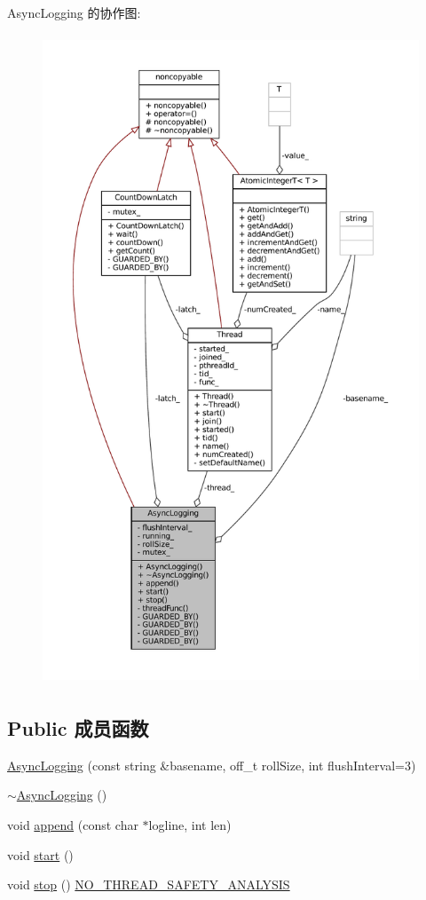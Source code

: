 Async\+Logging 的协作图\+:
\nopagebreak
\begin{figure}[H]
\begin{center}
\leavevmode
\includegraphics[height=550pt]{classmuduo_1_1AsyncLogging__coll__graph}
\end{center}
\end{figure}
\subsection*{Public 成员函数}
\begin{DoxyCompactItemize}
\item 
\hyperlink{classmuduo_1_1AsyncLogging_a6ef9864cb4ac325e919c449e1dd76224}{Async\+Logging} (const string \&basename, off\+\_\+t roll\+Size, int flush\+Interval=3)
\item 
\hyperlink{classmuduo_1_1AsyncLogging_aa008935e7ad96a6ade750a9c5ec984b7}{$\sim$\+Async\+Logging} ()
\item 
void \hyperlink{classmuduo_1_1AsyncLogging_a14dd7b692df8633d1e5053d3499a24d3}{append} (const char $\ast$logline, int len)
\item 
void \hyperlink{classmuduo_1_1AsyncLogging_a60de64d75454385b23995437f1d72669}{start} ()
\item 
void \hyperlink{classmuduo_1_1AsyncLogging_a849302529291497f64017bf57efb5606}{stop} () \hyperlink{Mutex_8h_ab8ec653d80c013941ef73e4c80cd44cf}{N\+O\+\_\+\+T\+H\+R\+E\+A\+D\+\_\+\+S\+A\+F\+E\+T\+Y\+\_\+\+A\+N\+A\+L\+Y\+S\+IS}
\end{DoxyCompactItemize}
